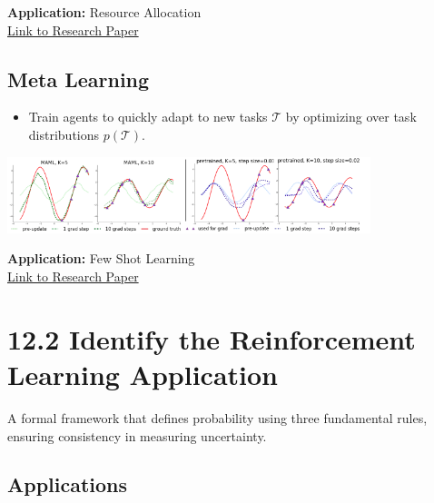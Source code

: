 \documentclass[
  letterpaper,
  DIV=11,
  numbers=noendperiod]{scrreprt}
\providecommand{\tightlist}{%
  \setlength{\itemsep}{0pt}\setlength{\parskip}{0pt}}\usepackage{longtable,booktabs,array}
\begin{document}
\textbf{Application:} Resource Allocation\\
\href{https://dl.acm.org/doi/10.1145/1390156.1390162}{Link to Research
Paper}

\section{Meta Learning}\label{meta-learning}

\begin{itemize}
\tightlist
\item
  Train agents to quickly adapt to new tasks \(\mathcal{T}\) by
  optimizing over task distributions \(p(\mathcal{T})\).
\end{itemize}

\includegraphics[width=4.16667in,height=\textheight,keepaspectratio]{lecture12/images/MetaLearning.png}

\textbf{Application:} Few Shot Learning\\
\href{https://arxiv.org/pdf/1703.03400}{Link to Research Paper}

\chapter{12.2 Identify the Reinforcement Learning
Application}\label{identify-the-reinforcement-learning-application}

\begin{tcolorbox}[enhanced jigsaw, arc=.35mm, toprule=.15mm, leftrule=.75mm, colback=white, left=2mm, colframe=quarto-callout-note-color-frame, rightrule=.15mm, opacityback=0, breakable, bottomrule=.15mm]

A formal framework that defines probability using three fundamental
rules, ensuring consistency in measuring uncertainty. 🎲

\end{tcolorbox}

\section{Applications}\label{applications}
\end{document}
